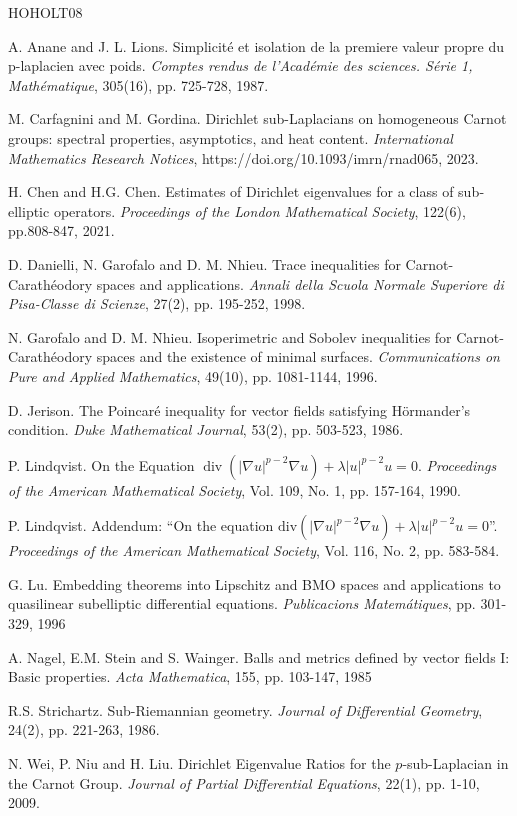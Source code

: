\documentclass[a4paper,12pt,reqno]{amsart}
\numberwithin{equation}{section}
\theoremstyle{plain}
\theoremstyle{definition}
\begin{document}
\begin{thebibliography}{HOHOLT08}




A. Anane  and J. L. Lions. Simplicité et isolation de la premiere valeur propre du p-laplacien avec poids. {\em Comptes rendus de l'Académie des sciences. Série 1, Mathématique}, 305(16), pp. 725-728, 1987.

M. Carfagnini and M. Gordina. Dirichlet sub-Laplacians on homogeneous Carnot groups: spectral properties, asymptotics, and heat content. {\em International Mathematics Research Notices}, https://doi.org/10.1093/imrn/rnad065, 2023.

H. Chen and H.G. Chen. Estimates of Dirichlet eigenvalues for a class of sub‐elliptic operators. {\em Proceedings of the London Mathematical Society}, 122(6), pp.808-847, 2021.

D. Danielli, N. Garofalo and D. M. Nhieu. Trace inequalities for Carnot-Carathéodory spaces and applications. {\em Annali della Scuola Normale Superiore di Pisa-Classe di Scienze}, 27(2), pp. 195-252, 1998.


N. Garofalo and D. M. Nhieu.  Isoperimetric and Sobolev inequalities for Carnot‐Carathéodory spaces and the existence of minimal surfaces. {\em Communications on Pure and Applied Mathematics}, 49(10), pp. 1081-1144, 1996.

D. Jerison. The Poincaré inequality for vector fields satisfying Hörmander’s condition. {\em Duke Mathematical Journal}, 53(2), pp. 503-523, 1986.

P. Lindqvist.
On the Equation $\operatorname{div}(|\nabla u|^{p-2}\nabla u) + \lambda|u| ^{p-2}u = 0$.
{\em Proceedings of the American Mathematical Society}, Vol. 109, No. 1, pp. 157-164, 1990.

P. Lindqvist.
Addendum: “On the equation $\textrm {div}(\vert \nabla u\vert ^ {p-2}\nabla u)+\lambda \vert u\vert ^ {p-2}u=0$”. {\em Proceedings of the American Mathematical Society}, Vol. 116, No. 2, pp. 583-584. 

G. Lu. Embedding theorems into Lipschitz and BMO spaces and applications to quasilinear subelliptic differential equations. {\em Publicacions Matemátiques}, pp. 301-329, 1996

A. Nagel, E.M. Stein and S. Wainger. Balls and metrics defined by vector fields I: Basic properties. {\em Acta Mathematica}, 155, pp. 103-147, 1985





R.S. Strichartz. Sub-Riemannian geometry. {\em Journal of Differential Geometry}, 24(2), pp. 221-263, 1986.


N. Wei, P. Niu and H. Liu. Dirichlet Eigenvalue Ratios for the $p$-sub-Laplacian in the Carnot Group. {\em Journal of Partial Differential Equations}, 22(1), pp. 1-10, 2009.
\end{thebibliography}
\end{document}
